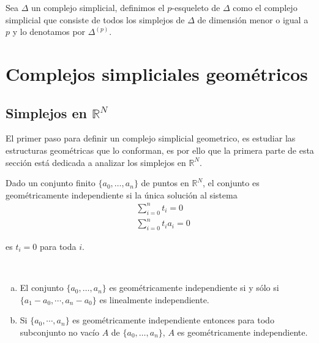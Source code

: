 \begin{Defi}
Sea $\Delta$ un complejo simplicial, definimos el $p$-esqueleto de $\Delta$ como el complejo simplicial que consiste de todos los simplejos de $\Delta$ de dimensión menor o igual a $p$ y lo denotamos por $\Delta^(p)$.
\end{Defi}

\section{Complejos simpliciales geométricos}
\subsection{Simplejos en $\mathbb{R}^N$}  
El primer paso para definir un complejo simplicial geometrico, es estudiar las estructuras geométricas que lo conforman, es por ello que la primera parte de esta sección está dedicada a analizar los simplejos en $\mathbb{R}^N$.           
\begin{Defi}
Dado un conjunto finito $\{a_0,\ldots,a_n\}$ de puntos en $\mathbb{R}^{N}$, el conjunto es geométricamente independiente si la única solución al sistema 
\begin{equation}\label{s1}
    \begin{split}
     &\sum_{i=0}^{n}t_{i} = 0 \\
     &\sum_{i=0}^{n}t_{i}a_{i} = 0   
    \end{split}
\end{equation}

es $t_i = 0$ para toda $i$.
\end{Defi}

\begin{Teo}
~\begin{enumerate}[(a)]
    \item El conjunto $\{a_0,\ldots,a_n\}$ es geométricamente independiente si y sólo si $\{a_1-a_0,\cdots,a_n-a_0\}$ es linealmente independiente.
    \item Si $\{a_0,\cdots,a_n\}$ es geométricamente independiente entonces para todo subconjunto no vacío $A$ de $\{a_0,\ldots,a_n\}$, $A$ es geométricamente independiente.
\end{enumerate}
\end{Teo}

